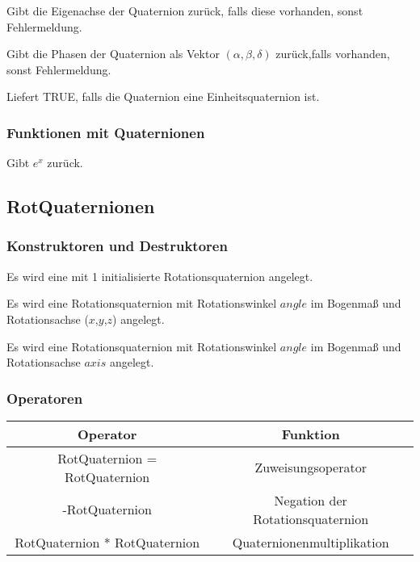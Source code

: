  		\descr
 		{
 			 Gibt die Eigenachse der Quaternion zurück, falls diese vorhanden, sonst Fehlermeldung.
 		}
 		
 		\descr
 		{
 			 Gibt die Phasen der Quaternion als Vektor $(\alpha,\beta,\delta) $ zurück,falls
 			 vorhanden, sonst Fehlermeldung.
 		}
 		
 		\descr
 		{
 			 Liefert TRUE, falls die Quaternion eine Einheitsquaternion ist.
 		}
 		
	\subsubsection{Funktionen mit Quaternionen}
 		\descr
 		{
 			 Gibt $e^x$ zurück.
 		}
\subsection{RotQuaternionen}
\hypertarget{RotQuaternion}{}
	\subsubsection{Konstruktoren und Destruktoren}
		\descr
		{
			Es wird eine mit 1 initialisierte Rotationsquaternion angelegt.
		}
	
		\descr
		{
			Es wird eine Rotationsquaternion mit Rotationswinkel $angle$ im Bogenmaß und
			Rotationsachse ($x$,$y$,$z$)	angelegt.
		}
	
		\descr
		{
			Es wird eine Rotationsquaternion mit Rotationswinkel $angle$ im Bogenmaß und
			Rotationsachse $axis$ angelegt.
		}
	

	\subsubsection{Operatoren}
		\begin{tabular}{|c|c|}
			\hline
			Operator & Funktion\\ 
			\hline
			RotQuaternion = RotQuaternion & Zuweisungsoperator\\
			\hline
			-RotQuaternion & Negation der Rotationsquaternion\\
			\hline
			RotQuaternion * RotQuaternion & Quaternionenmultiplikation\\
			\hline
	\end{tabular}
	
